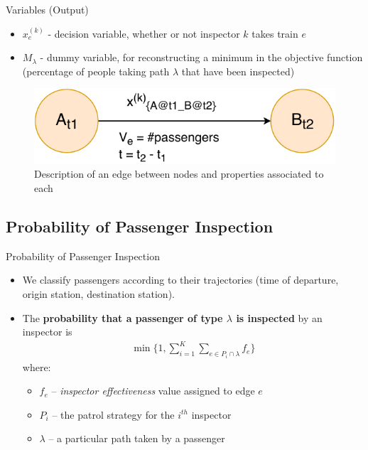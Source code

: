 \documentclass[handout]{beamer}
\begin{document}
\begin{frame}{Variables (Output)}
    \begin{itemize}
        \item $x^{(k)}_{e}$ - decision variable, whether or not inspector $k$ takes train $e$
        \item $M_{\lambda}$ - dummy variable, for reconstructing a minimum in the objective function (percentage of people taking path $\lambda$ that have been inspected)
        
    \end{itemize}
    \begin{figure}
        \centering
        \includegraphics[scale=0.7]{nodes.pdf}
        \caption{Description of an edge between nodes and properties associated to each}
    \end{figure}

\end{frame}

\subsection{Probability of Passenger Inspection}

\begin{frame}{Probability of Passenger Inspection}
\begin{itemize}
    \item We classify passengers according to their trajectories (time of departure, origin station, destination station). 
    
    \item The \textbf{probability that a passenger of type $\lambda$ is inspected} by an inspector is
\begin{align*}
    \min\bigg\{1,\sum_{i=1}^K\sum_{e\in P_i\cap\lambda} f_e\bigg\}
\end{align*}
where:
\begin{itemize}
    \item $f_e$ -- \textit{inspector effectiveness} value assigned to edge $e$
    \item $P_i$ -- the patrol strategy for the $i^{th}$ inspector
    \item $\lambda$ -- a particular path taken by a passenger
\end{itemize}
\end{itemize}

\end{frame}
\end{document}
